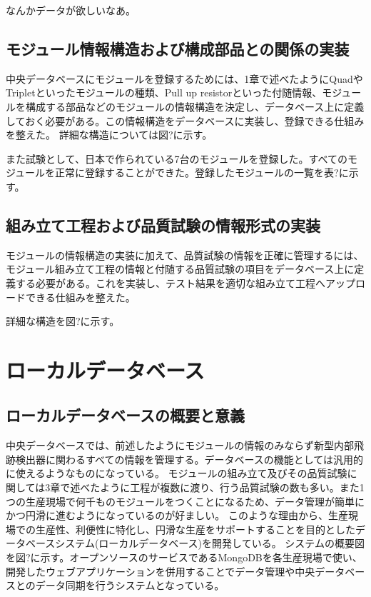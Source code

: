 なんかデータが欲しいなあ。

\subsection{モジュール情報構造および構成部品との関係の実装}
中央データベースにモジュールを登録するためには、1章で述べたようにQuadやTripletといったモジュールの種類、Pull up resistorといった付随情報、モジュールを構成する部品などのモジュールの情報構造を決定し、データベース上に定義しておく必要がある。この情報構造をデータベースに実装し、登録できる仕組みを整えた。
詳細な構造については図?に示す。


また試験として、日本で作られている7台のモジュールを登録した。すべてのモジュールを正常に登録することができた。登録したモジュールの一覧を表?に示す。


\subsection{組み立て工程および品質試験の情報形式の実装}
モジュールの情報構造の実装に加えて、品質試験の情報を正確に管理するには、モジュール組み立て工程の情報と付随する品質試験の項目をデータベース上に定義する必要がある。これを実装し、テスト結果を適切な組み立て工程へアップロードできる仕組みを整えた。

詳細な構造を図?に示す。

\section{ローカルデータベース}
\subsection{ローカルデータベースの概要と意義}
中央データベースでは、前述したようにモジュールの情報のみならず新型内部飛跡検出器に関わるすべての情報を管理する。データベースの機能としては汎用的に使えるようなものになっている。
モジュールの組み立て及びその品質試験に関しては3章で述べたように工程が複数に渡り、行う品質試験の数も多い。また1つの生産現場で何千ものモジュールをつくことになるため、データ管理が簡単にかつ円滑に進むようになっているのが好ましい。
このような理由から、生産現場での生産性、利便性に特化し、円滑な生産をサポートすることを目的としたデータベースシステム(ローカルデータベース)を開発している。
システムの概要図を図?に示す。オープンソースのサービスであるMongoDBを各生産現場で使い、開発したウェブアプリケーションを併用することでデータ管理や中央データベースとのデータ同期を行うシステムとなっている。

